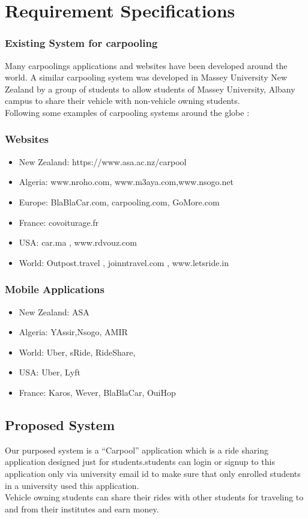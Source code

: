 \chapter{Requirement Specifications} \label{chap:reqs}

\subsection{Existing System for carpooling}
Many carpoolings applications and websites have been developed around the world. A similar carpooling system was developed in Massey University New Zealand by a group of students to allow students of Massey University, Albany campus to share their vehicle with non-vehicle owning students.
\\ Following some examples of carpooling systems around the globe : 

\subsection{Websites}
\begin{itemize}

\item New Zealand: https://www.asa.ac.nz/carpool
\item Algeria: www.nroho.com, www.m3aya.com,www.nsogo.net
\item Europe: BlaBlaCar.com, carpooling.com, GoMore.com
\item France: covoiturage.fr
\item USA: car.ma , www.rdvouz.com
\item World: Outpost.travel , joinntravel.com , www.letsride.in

\end{itemize}

\subsection{Mobile Applications}
\begin{itemize}

\item New Zealand: ASA
\item Algeria: YAssir,Nsogo, AMIR
\item World: Uber, sRide, RideShare, 
\item USA: Uber, Lyft
\item France: Karos, Wever, BlaBlaCar, OuiHop

\end{itemize}
\section{Proposed System}
Our purposed system is a “Carpool” application which is a ride sharing application designed just for students.students can login or signup to this application only via university email id to make sure that only enrolled students in a university used this application.
\\ Vehicle owning students can share their rides with other students for traveling to and from their institutes and earn money.

